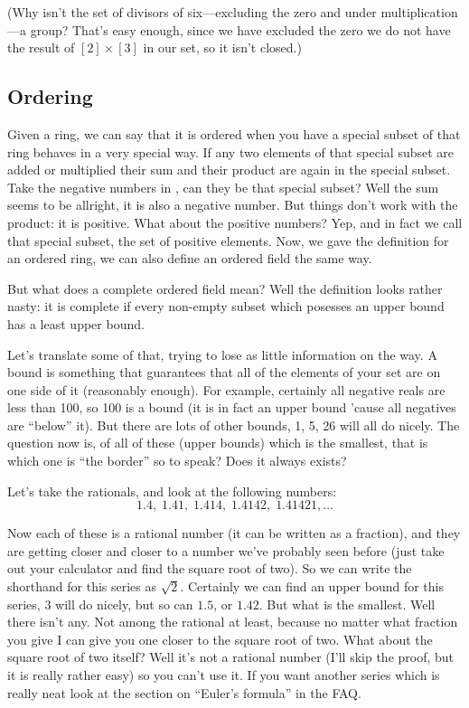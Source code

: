 (Why isn't the set of divisors of six---excluding the zero and under
multiplication---a group?  That's easy enough, since we have excluded
the zero we do not have the result of $[2] \times [3]$ in our set, so it
isn't closed.)

\subsection{Ordering}

Given a ring, we can say that it is ordered when you have a special
subset of that ring behaves in a very special way. If any two elements
of that special subset are added or multiplied their sum and their
product are again in the special subset. Take the negative numbers in
\R{}, can they be that special subset? Well the sum seems to be
allright, it is also a negative number. But things don't work with the
product: it is positive. What about the positive numbers? Yep, and in
fact we call that special subset, the set of positive elements. Now, we
gave the definition for an ordered ring, we can also define an ordered
field the same way.

But what does a complete ordered field mean? Well the definition looks
rather nasty: it is complete if every non-empty subset which posesses an
upper bound has a least upper bound.

Let's translate some of that, trying to lose as little information on
the way. A bound is something that guarantees that all of the elements
of your set are on one side of it (reasonably enough). For example,
certainly all negative reals are less than 100, so 100 is a bound (it is
in fact an upper bound 'cause all negatives are ``below'' it). But there
are lots of other bounds, 1, 5, 26 will all do nicely. The question now
is, of all of these (upper bounds) which is the smallest, that is which
one is ``the border'' so to speak? Does it always exists?

Let's take the rationals, and look at the following numbers:
\[1.4, \; 1.41, \; 1.414, \; 1.4142, \; 1.41421, \ldots \]

Now each of these is a rational number (it can be written as a
fraction), and they are getting closer and closer to a number we've
probably seen before (just take out your calculator and find the square
root of two).  So we can write the shorthand for this series as
$\sqrt{2}$.  Certainly we can find an upper bound for this series, $3$
will do nicely, but so can $1.5$, or $1.42$. But what is the
smallest. Well there isn't any. Not among the rational at least, because
no matter what fraction you give I can give you one closer to the square
root of two. What about the square root of two itself? Well it's not a
rational number (I'll skip the proof, but it is really rather easy) so
you can't use it.  If you want another series which is really neat look
at the section on ``Euler's formula'' in the FAQ.

